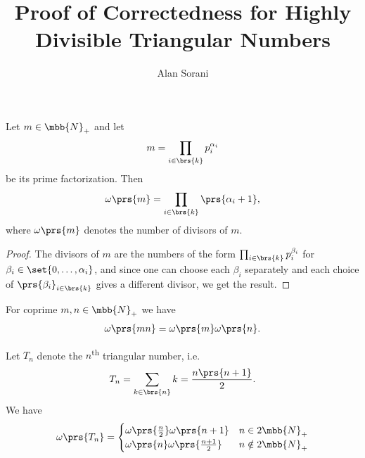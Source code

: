 \documentclass[10pt]{article}
\author{Alan Sorani}
\title{Proof of Correctedness for Highly Divisible Triangular Numbers}
\begin{document}
\maketitle

\begin{lemma}
Let
$m \in \mbb{N}_+$
and let
\begin{align*}
m = \prod_{i \in \brs{k}} p_i^{\alpha_i}
\end{align*}
be its prime factorization.
Then
\begin{align*}
\omega\prs{m} = \prod_{i \in \brs{k}} \prs{\alpha_i + 1} \text{,}
\end{align*}
where $\omega\prs{m}$ denotes the number of divisors of $m$.
\end{lemma}

\begin{proof}
The divisors of $m$ are the numbers of the form
$\prod_{i \in \brs{k}} p_i^{\beta_i}$
for $\beta_i \in \set{0, \ldots, \alpha_i}$, and since one can choose each $\beta_i$ separately and each choice of $\prs{\beta_i}_{i \in \brs{k}}$ gives a different divisor, we get the result.
\end{proof}

\begin{corollary}
For coprime $m,n \in \mbb{N}_+$ we have
\begin{align*}
\omega\prs{mn} = \omega\prs{m} \omega\prs{n} \text{.}
\end{align*}
\end{corollary}

\begin{corollary}
Let $T_n$ denote the $n$\textsuperscript{th} triangular number, i.e.
\begin{align*}
T_n = \sum_{k \in \brs{n}} k = \frac{n\prs{n+1}}{2} \text{.}
\end{align*}
We have
\begin{align*}
\omega\prs{T_n} =
\begin{cases}
\omega\prs{\frac{n}{2}} \omega\prs{n+1} & n \in 2\mbb{N}_+ \\
\omega\prs{n} \omega\prs{\frac{n+1}{2}} & n \notin 2 \mbb{N}_+
\end{cases}
\end{align*}
\end{corollary}

\printbibliography
\end{document}
